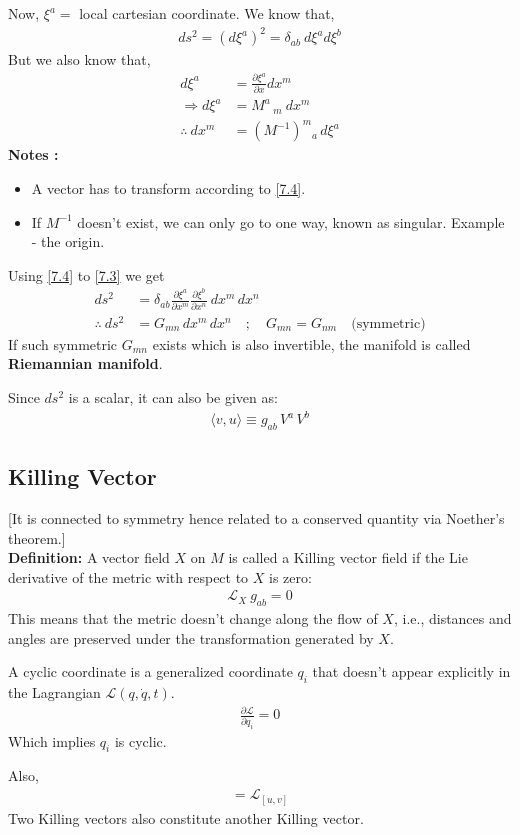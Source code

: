 \documentclass[14pt]{article} %
\begin{document}
Now, $\xi^a =$ local cartesian coordinate. We know that,
\begin{align*}
ds^2 = \left( d \xi^a \right)^2 = \delta_{ab}~d\xi^a d\xi^b \tag{7.3} \label{7.3}
\end{align*}
But we also know that,
\begin{align*}
d\xi^a &= \frac{\partial\xi^a}{\partial x}dx^m \tag{7.4} \label{7.4} \\
\Rightarrow d\xi^a&= M^a\,_m ~dx^m \\
\therefore~ dx^m &= (M^{-1})^m{}_a \, d\xi^a
\end{align*}
\textbf{Notes :}
\begin{itemize}
\item A vector has to transform according to \eqref{7.4}.
\item If $M^{-1}$ doesn't exist, we can only go to one way, known as singular. Example - the origin.
\end{itemize}
Using \eqref{7.4} to \eqref{7.3} we get
\begin{align*}
ds^2 &= \delta_{ab} \frac{\partial\xi^a}{\partial x^m} \frac{\partial  \xi^b}{\partial x^n}~dx^m \, dx^n \\
\therefore~ ds^2 &= G_{mn} \, dx^m \, dx^n \quad ; \quad G_{mn} = G_{nm} \quad \text{(symmetric)}
\end{align*}
If such symmetric $G_{mn}$ exists which is also invertible, the manifold is called \textbf{Riemannian manifold}.

Since $ds^2$ is a scalar, it can also be given as:
\begin{align*}
    \langle v, u \rangle \equiv g_{ab} \, V^a \, V^b
\end{align*}

\subsection{Killing Vector}
[It is connected to symmetry hence related to a conserved quantity via Noether's theorem.]\\

\noindent
\textbf{Definition:} A vector field $X$ on $M$ is called a Killing vector field if the Lie derivative of the metric with respect to $X$ is zero:
\begin{align*}
    \mathscr{L}_X~g_{ab} = 0
\end{align*}
\noindent
This means that the metric doesn't change along the flow of $X$, i.e., distances and angles are preserved under the transformation generated by $X$.
\begin{tcolorbox}[ title=Cyclic Coordinates]
A cyclic coordinate is a generalized coordinate $q_i$ that doesn't appear explicitly in the Lagrangian $\mathcal{L}(q, \dot{q},t)$. 
\begin{align*}
    \frac{\partial \mathcal{L}}{\partial q_i} = 0
\end{align*}
Which implies $q_i$ is cyclic.
\end{tcolorbox}
Also,
\begin{align*}
    [\mathscr{L}_u, \mathscr{L}_v] = \mathscr{L}_{[u, v]}
\end{align*}
Two Killing vectors also constitute another Killing vector.
\end{document}
